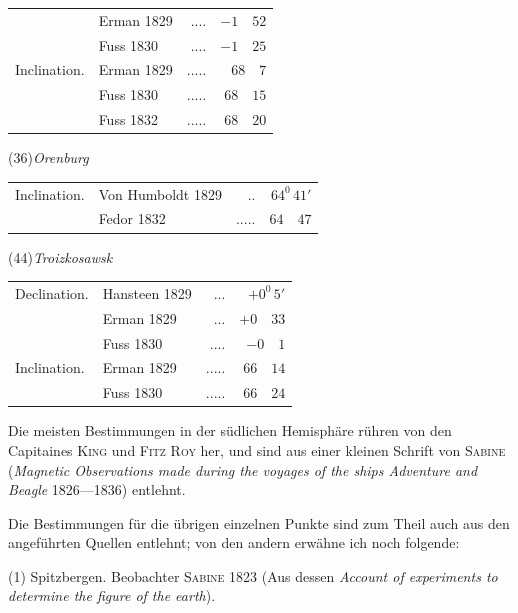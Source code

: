 \begin{center}
\begin{minipage}[t]{\linewidth}
\begin{tabular}{llrr}
&Erman 1829&.\quad.\quad.\quad.&$-1\quad52$\\
&Fuss 1830&.\quad.\quad.\quad.&$-1\quad25$\\
Inclination.&Erman 1829&.\quad.\quad.\quad.\quad.&$68\quad7$\\
&Fuss 1830&.\quad.\quad.\quad.\quad.&$68\quad15$\\
&Fuss 1832&.\quad.\quad.\quad.\quad.&$68\quad20$
\end{tabular}
\end{minipage}\par\medskip
\begin{minipage}[t]{\linewidth}\centering
(36)\quad\textit{Orenburg}\par\smallskip
\begin{tabular}{llrr}
Inclination.&Von Humboldt 1829&.\quad.&$64^0\,41'$\\
&Fedor 1832&.\quad.\quad.\quad.\quad.&$64\quad47$
\end{tabular}
\end{minipage}\par\medskip
\begin{minipage}[t]{\linewidth}\centering
(44)\quad\textit{Troizkosawsk}\par\smallskip
\begin{tabular}{llrr}
Declination.&Hansteen 1829&.\quad.\quad.&$+0^0\,5'$\\
&Erman 1829&.\quad.\quad.&$+0\quad33$\\
&Fuss 1830&.\quad.\quad.\quad.&$-0\quad1$\\
Inclination.&Erman 1829&.\quad.\quad.\quad.\quad.&$66\quad14$\\
&Fuss 1830&.\quad.\quad.\quad.\quad.&$66\quad24$
\end{tabular}
\end{minipage}
\end{center}

\par\clearpage
{}
Die meisten Bestimmungen in der südlichen Hemisphäre rühren von den Capitaines \textsc{King} und \textsc{Fitz Roy} her, und sind aus einer kleinen Schrift von \textsc{Sabine} (\textit{Magnetic Observations made during the voyages of the ships Adventure and Beagle} 1826—1836) entlehnt.

Die Bestimmungen für die übrigen einzelnen Punkte sind zum Theil auch aus den angeführten Quellen entlehnt; von den andern erwähne ich noch folgende:

(1) Spitzbergen. Beobachter \textsc{Sabine} 1823 (Aus dessen \textit{Account of experiments to determine the figure of the earth}).

